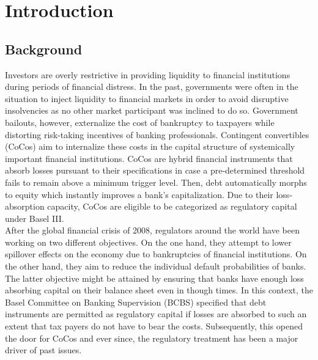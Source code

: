 \chapter{Introduction}

\section{Background}
Investors are overly restrictive in providing liquidity to financial institutions during periods of financial distress. In the past, governments were often in the situation to inject liquidity to financial markets in order to avoid disruptive insolvencies as no other market participant was inclined to do so. Government bailouts, however, externalize the cost of bankruptcy to taxpayers while distorting risk-taking incentives of banking professionals. Contingent convertibles (CoCos) aim to internalize these costs in the capital structure of systemically important financial institutions. CoCos are hybrid financial instruments that absorb losses pursuant to their specifications in case a pre-determined threshold fails to remain above a minimum trigger level. Then, debt automatically morphs to equity which instantly improves a bank's capitalization. Due to their loss-absorption capacity, CoCos are eligible to be categorized as regulatory capital under Basel III. \citep{avdjiev2013cocos} \\

After the global financial crisis of 2008, regulators around the world have been working on two different objectives. On the one hand, they attempt to lower spillover effects on the economy due to bankruptcies of financial institutions. On the other hand, they aim to reduce the individual default probabilities of banks. The latter objective might be attained by ensuring that banks have enough loss absorbing capital on their balance sheet even in though times. \citep{de2011handbook} In this context, the Basel Committee on Banking Supervision (BCBS) specified that debt instruments are permitted as regulatory capital if losses are absorbed to such an extent that tax payers do not have to bear the costs. \citep{basel2011press} Subsequently, this opened the door for CoCos and ever since, the regulatory treatment has been a major driver of past issues.



